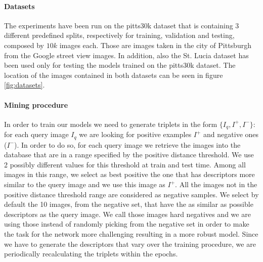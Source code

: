 \documentclass[10pt,twocolumn,letterpaper]{article}
\begin{document}
\paragraph{Datasets}
The experiments have been run on the pitts30k dataset \cite{NETVLAD} that is containing 3 different predefined splits, respectively for 
training, validation and testing, composed by $10k$ images each. Those are images taken in the city of Pittsburgh from the Google street
view images. In addition, also the St. Lucia dataset \cite{st_lucia} has been used only for testing the models trained on the pitts30k dataset.
The location of the images contained in both datasets can be seen in figure \ref{fig:datasets}.

\paragraph{Mining procedure}\label{par:mining}
In order to train our models we need to generate triplets in the form $\{I_q, I^+, I^-\}$: for each query image $I_q$ we are looking for
positive examples $I^+$ and negative ones ($I^-$). In order to do so, for each query image we retrieve the images into the database that are
in a range specified by the positive distance threshold. We use 2 possibly different values for this threshold at train and test time.
Among all images in this range, we select as best positive the one that has descriptors more similar to the query image and we use this image
as $I^+$. All the images not in the positive distance threshold range are considered as negative samples. We select by default the 10 
images, from the negative set, that have the as similar as possible descriptors as the query image. We call those images hard negatives and
we are using those instead of randomly picking from the negative set in order to make the task for the network more challenging resulting in 
a more robust model. Since we have to generate the descriptors that vary over the training procedure, we are periodically recalculating the 
triplets within the epochs.
\end{document}
